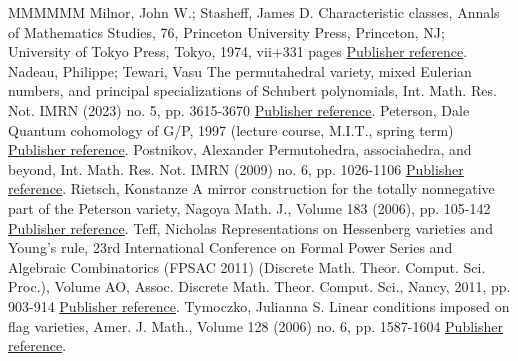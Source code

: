 \documentclass[11pt]{article}
\theoremstyle{definition}
\numberwithin{equation}{section}
\numberwithin{equation}{section}
\begin{document}
\begin{thebibliography}{MMMMMM}
 Milnor, John W.; Stasheff, James D. Characteristic classes, Annals of Mathematics Studies, 76, Princeton University Press, Princeton, NJ; University of Tokyo Press, Tokyo, 1974, vii+331 pages \href{https://alco.centre-mersenne.org/articles/10.5802/alco.342/#Milnor-Stasheff}{Publisher reference}.
 Nadeau, Philippe; Tewari, Vasu The permutahedral variety, mixed Eulerian numbers, and principal specializations of Schubert polynomials, Int. Math. Res. Not. IMRN (2023) no. 5, pp. 3615-3670 \href{https://alco.centre-mersenne.org/articles/10.5802/alco.342/#Nadeau-Tewari}{Publisher reference}.
 Peterson, Dale Quantum cohomology of G/P, 1997 (lecture course, M.I.T., spring term) \href{https://alco.centre-mersenne.org/articles/10.5802/alco.342/#Peterson}{Publisher reference}.
 Postnikov, Alexander Permutohedra, associahedra, and beyond, Int. Math. Res. Not. IMRN (2009) no. 6, pp. 1026-1106 \href{https://alco.centre-mersenne.org/articles/10.5802/alco.342/#Postnikov09}{Publisher reference}.
 Rietsch, Konstanze A mirror construction for the totally nonnegative part of the Peterson variety, Nagoya Math. J., Volume 183 (2006), pp. 105-142 \href{https://alco.centre-mersenne.org/articles/10.5802/alco.342/#Rietsch06}{Publisher reference}.
 Teff, Nicholas Representations on Hessenberg varieties and Young’s rule, 23rd International Conference on Formal Power Series and Algebraic Combinatorics (FPSAC 2011) (Discrete Math. Theor. Comput. Sci. Proc.), Volume AO, Assoc. Discrete Math. Theor. Comput. Sci., Nancy, 2011, pp. 903-914 \href{https://alco.centre-mersenne.org/articles/10.5802/alco.342/#Teff11}{Publisher reference}.
 Tymoczko, Julianna S. Linear conditions imposed on flag varieties, Amer. J. Math., Volume 128 (2006) no. 6, pp. 1587-1604 \href{https://alco.centre-mersenne.org/articles/10.5802/alco.342/#ty}{Publisher reference}.
\end{thebibliography}
\end{document}
